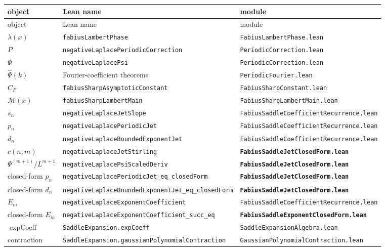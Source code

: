 \documentclass[11pt,oneside]{article}
\theoremstyle{definition}
\theoremstyle{remark}
\newcommand{\Psihat}{\widehat\Psi}
\begin{document}
\begin{center}\small
\begin{longtable}{@{}lll@{}}
\toprule
object & Lean name & module\\
\midrule
\endfirsthead
\toprule
object & Lean name & module\\
\midrule
\endhead
$\lambda(x)$ & \texttt{fabiusLambertPhase} & \texttt{FabiusLambertPhase.lean}\\
$P$ & \texttt{negativeLaplacePeriodicCorrection} & \texttt{PeriodicCorrection.lean}\\
$\Psi$ & \texttt{negativeLaplacePsi} & \texttt{PeriodicCorrection.lean}\\
$\Psihat(k)$ & Fourier-coefficient theorems & \texttt{PeriodicFourier.lean}\\
$C_F$ & \texttt{fabiusSharpAsymptoticConstant} & \texttt{FabiusSharpConstant.lean}\\
$\mathcal M(x)$ & \texttt{fabiusSharpLambertMain} & \texttt{FabiusSharpLambertMain.lean}\\
$s_n$ & \texttt{negativeLaplaceJetSlope} & \texttt{FabiusSaddleCoefficientRecurrence.lean}\\
$p_n$ & \texttt{negativeLaplacePeriodicJet} & \texttt{FabiusSaddleCoefficientRecurrence.lean}\\
$d_n$ & \texttt{negativeLaplaceBoundedExponentJet} & \texttt{FabiusSaddleCoefficientRecurrence.lean}\\
$c(n,m)$ & \texttt{negativeLaplaceJetStirling} & \textbf{\texttt{FabiusSaddleJetClosedForm.lean}}\\
$\Psi^{(m+1)}/L^{m+1}$ & \texttt{negativeLaplacePsiScaledDeriv} & \textbf{\texttt{FabiusSaddleJetClosedForm.lean}}\\
closed-form $p_n$ & \texttt{negativeLaplacePeriodicJet\_eq\_closedForm} & \textbf{\texttt{FabiusSaddleJetClosedForm.lean}}\\
closed-form $d_n$ & \texttt{negativeLaplaceBoundedExponentJet\_eq\_closedForm} & \textbf{\texttt{FabiusSaddleJetClosedForm.lean}}\\
$E_m$ & \texttt{negativeLaplaceExponentCoefficient} & \texttt{FabiusSaddleCoefficientRecurrence.lean}\\
closed-form $E_m$ & \texttt{negativeLaplaceExponentCoefficient\_succ\_eq} & \textbf{\texttt{FabiusSaddleExponentClosedForm.lean}}\\
$\operatorname{expCoeff}$ & \texttt{SaddleExpansion.expCoeff} & \texttt{SaddleExpansionAlgebra.lean}\\
contraction & \texttt{SaddleExpansion.gaussianPolynomialContraction} & \texttt{GaussianPolynomialContraction.lean}\\

\end{longtable}
\end{center}
\end{document}

